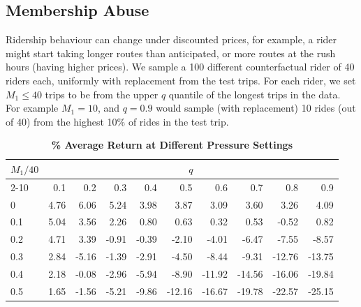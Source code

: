 \documentclass[12pt]{article}
\begin{document}
{{{{{{\subsection{Membership Abuse}
\label{membership_abuse}
Ridership behaviour can change under discounted prices, for example, a rider might start taking longer routes than anticipated, or more routes at the rush hours (having higher prices). We sample a 100 different counterfactual rider of 40 riders each, uniformly with replacement from the test trips. For each rider, we set $M_1 \leq 40$ trips to be from the upper $q$ quantile of the longest trips in the data. For example $M_1 = 10$, and $q=0.9$ would sample (with replacement) 10 rides (out of 40) from the highest 10\% of rides in the test trip.
\begin{table}[ht]
\centering
\caption{\textbf{\% Average Return at Different Pressure Settings}}
\begin{tabular}{l | *{9}{r}}
\toprule
\multicolumn{1}{c|}{\footnotesize{$M_1/40$}} & \multicolumn{9}{c}{$q$} \\ 
 \cmidrule(lr){2-10} 
 {\footnotesize }& 0.1    & 0.2     & 0.3      & 0.4      & 0.5      & 0.6       & 0.7       & 0.8       & 0.9       \\
\midrule
0    & 4.76 & 6.06 & 5.24 & 3.98 & 3.87 & 3.09 & 3.60 & 3.26 & 4.09 \\
0.1  & 5.04 & 3.56 & 2.26 & 0.80 & 0.63 & 0.32 & 0.53 & -0.52 & 0.82 \\
0.2  & 4.71 & 3.39 & -0.91 & -0.39 & -2.10 & -4.01 & -6.47 & -7.55 & -8.57 \\
0.3  & 2.84 & -5.16 & -1.39 & -2.91 & -4.50 & -8.44 & -9.31 & -12.76 & -13.75 \\
0.4  & 2.18 & -0.08 & -2.96 & -5.94 & -8.90 & -11.92 & -14.56 & -16.06 & -19.84 \\
0.5  & 1.65 & -1.56 & -5.21 & -9.86 & -12.16 & -16.67 & -19.78 & -22.57 & -25.15 \\
\bottomrule
\end{tabular}
\end{table}


}}}}}}
\end{document}
